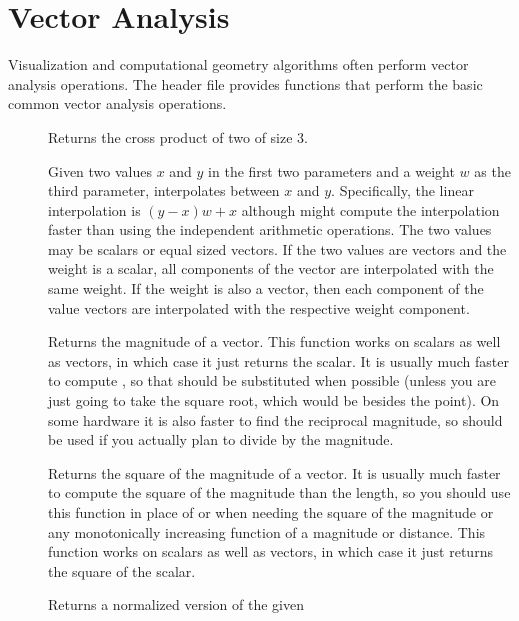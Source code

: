\section{Vector Analysis}


Visualization and computational geometry algorithms often perform vector
analysis operations. The  header file
provides functions that perform the basic common vector analysis
operations.

\begin{description}
\item[]  Returns the cross product of
  two  of size 3.
\item[]  Given two values $x$ and
  $y$ in the first two parameters and a weight $w$ as the third parameter,
  interpolates between $x$ and $y$. Specifically, the linear interpolation
  is $(y-x)w + x$ although  might compute the
  interpolation faster than using the independent arithmetic operations.
  The two values may be scalars or equal sized vectors. If the two values
  are vectors and the weight is a scalar, all components of the vector are
  interpolated with the same weight. If the weight is also a vector, then
  each component of the value vectors are interpolated with the respective
  weight component.
\item[] Returns the magnitude of a vector. This function
  works on scalars as well as vectors, in which case it just returns the
  scalar. It is usually much faster to compute
  , so that should be substituted when
  possible (unless you are just going to take the square root, which would
  be besides the point). On some hardware it is also faster to find the
  reciprocal magnitude, so  should be used if
  you actually plan to divide by the magnitude.
\item[] Returns the square of the magnitude of a
  vector. It is usually much faster to compute the square of the magnitude
  than the length, so you should use this function in place of
   or  when needing
  the square of the magnitude or any monotonically increasing function of a
  magnitude or distance. This function works on scalars as well as vectors,
  in which case it just returns the square of the scalar.
\item[] Returns a normalized version of the given

\end{description}
